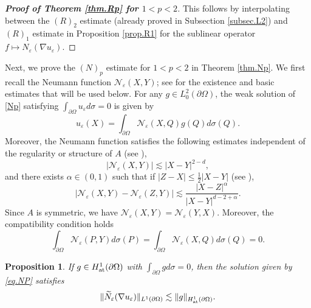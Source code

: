 \documentclass[reqno,12pt]{amsart} %
\newtheorem{proposition}[theorem]{Proposition}
\theoremstyle{definition}
\theoremstyle{remark}
\numberwithin{equation}{section}
\newcommand{\e}{\varepsilon}
\begin{document}
\begin{proof}[\textbf{Proof of Theorem \ref{thm.Rp} for $1<p<2$}]
    This follows by  interpolating  between the $(R)_2$ estimate (already proved in Subsection \ref{subsec.L2}) and $(R)_1$ estimate  in Proposition \ref{prop.R1} for the sublinear operator $f \mapsto N_\e(\nabla u_\e)$.
\end{proof}

Next, we prove the $(N)_p$ estimate for $1<p<2$ in Theorem \ref{thm.Np}.
We first recall the Neumann function $\mathcal{N}_\e(X,Y)$; see \cite{KP93} for the existence and basic estimates that will be used below. For any $g\in L_0^2(\partial \Omega)$, the weak solution of \eqref{Np} satisfying $\int_{\partial \Omega} u_\e d\sigma = 0$ is given by
\begin{equation}\label{eq.NP}
    u_\e(X) = \int_{\partial \Omega} \mathcal{N}_\e(X,Q) g(Q) d\sigma(Q).
\end{equation}
Moreover, the Neumann function satisfies the following estimates independent of the regularity or structure of $A$ (see \cite[Definition 2.5 and Lemma 2.10]{KP93}),
\begin{equation}
    |\mathcal{N}_\e(X,Y)| \lesssim |X-Y|^{2-d},
\end{equation}
and there exists $\alpha \in (0,1)$ such that if $|Z-X| \le \frac12 |X-Y|$ (see \cite[Corollary 2.14]{KP93}),
\begin{equation}\label{est.NF.Holder}
    |\mathcal{N}_\e(X,Y) - \mathcal{N}_\e(Z,Y)| \lesssim \frac{|X-Z|^\alpha}{|X-Y|^{d-2+\alpha}}.
\end{equation}
Since $A$ is symmetric, we have $\mathcal{N}_\e(X,Y) = \mathcal{N}_\e(Y,X)$.
Moreover, the compatibility condition holds
\begin{equation}
    \int_{\partial \Omega} \mathcal{N}_\e(P,Y) d\sigma(P) = \int_{\partial \Omega} \mathcal{N}_\e(X,Q) d\sigma(Q) = 0.
\end{equation}

\begin{proposition}\label{prop.N1}
    If $g \in H_{\rm at}^1(\partial \Omega)$ with $\int_{\partial \Omega} g d\sigma = 0$, then the solution given by \eqref{eq.NP} satisfies
\begin{equation}\label{est.NP.L1}
    \| \widetilde{N}_\e(\nabla u_\e) \|_{L^1(\partial \Omega)} \lesssim \| g \|_{H^1_{\rm at}(\partial \Omega)}.
\end{equation}
\end{proposition}
\end{document}
